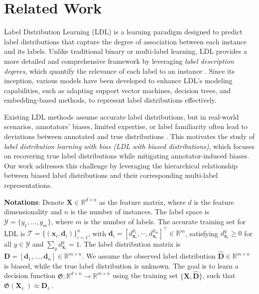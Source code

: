 \section{Related Work}
Label Distribution Learning (LDL) \cite{6475129} is a learning paradigm designed to predict label distributions that capture the degree of association between each instance and its labels. Unlike traditional binary or multi-label learning, LDL provides a more detailed and comprehensive framework by leveraging \textit{label description degrees}, which quantify the relevance of each label to an instance \cite{10275121}. Since its inception, various models have been developed to enhance LDL’s modeling capabilities, such as adapting support vector machines, decision trees, and embedding-based methods, to represent label distributions effectively.

Existing LDL methods assume accurate label distributions, but in real-world scenarios, annotators’ biases, limited expertise, or label familiarity often lead to deviations between annotated and true distributions \cite{10540001}. This motivates the study of \textit{label distribution learning with bias (LDL with biased distributions)}, which focuses on recovering true label distributions while mitigating annotator-induced biases. Our work addresses this challenge by leveraging the hierarchical relationship between biased label distributions and their corresponding multi-label representations.

\textbf{Notations}: Denote \(\mathbf{X} \in \mathbb{R}^{d \times n}\) as the feature matrix, where \(d\) is the feature dimensionality and \(n\) is the number of instances. The label space is \(\mathcal{Y} = \{y_1,\ldots, y_m\}\), where \(m\) is the number of labels. The accurate training set for LDL is \(\mathcal{T} = \{(\mathbf{x}_i, \mathbf{d}_i)\}_{i=1}^n\), with \(\mathbf{d}_i = [d_{\mathbf{x}_i}^{y_1}, \cdots, d_{\mathbf{x}_i}^{y_m}]^\top \in \mathbb{R}^m\), satisfying \(d_{\mathbf{x}_i}^y \geq 0\) for all \(y \in \mathcal{Y}\) and \(\sum_{y} d_{\mathbf{x}_i}^y = 1\). The label distribution matrix is \(\mathbf{D} = [\mathbf{d}_1,\ldots, \mathbf{d}_n] \in \mathbb{R}^{m \times n}\). We assume the observed label distribution \(\hat{\mathbf{D}} \in \mathbb{R}^{m \times n}\) is biased, while the true label distribution is unknown. The goal is to learn a decision function \(\mathfrak{G}: \mathbb{R}^{d \times n} \to \mathbb{R}^{m\times n}\) using the training set \(\{\mathbf{X}, \hat{\mathbf{D}}\}\), such that \(\mathfrak{G}(\mathbf{X}_{i:}) \approx {\mathbf{D}}_{i:}\).